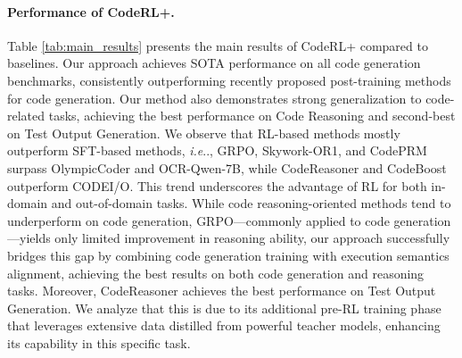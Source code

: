 \documentclass{article}
\makeatletter
\DeclareRobustCommand\onedot{\futurelet\@let@token\@onedot}
\def\@onedot{\ifx\@let@token.\else.\null\fi\xspace}
\def\ie{\emph{i.e}\onedot} \def\Ie{\emph{i.e}\onedot}
\DeclareRobustCommand{\ourapproach}{{\sc CodeRL+}\xspace}
\DeclareRobustCommand{\ourapproachbf}{{\sc \textbf{CodeRL+}}\xspace}
\theoremstyle{definition}
\theoremstyle{remark}
\makeatother
\begin{document}
\paragraph{Performance of \ourapproachbf.}
Table \ref{tab:main_results} presents the main results of \ourapproach compared to baselines. Our approach achieves SOTA performance on all code generation benchmarks, consistently outperforming recently proposed post-training methods for code generation. Our method also demonstrates strong generalization to code-related tasks, achieving the best performance on Code Reasoning and second-best on Test Output Generation. We observe that RL-based methods mostly outperform SFT-based methods, \ie, GRPO, Skywork-OR1, and CodePRM surpass OlympicCoder and OCR-Qwen-7B, while CodeReasoner and CodeBoost outperform CODEI/O. This trend underscores the advantage of RL for both in-domain and out-of-domain tasks. While code reasoning-oriented methods tend to underperform on code generation, GRPO—commonly applied to code generation—yields only limited improvement in reasoning ability, our approach successfully bridges this gap by combining code generation training with execution semantics alignment, achieving the best results on both code generation and reasoning tasks. Moreover, CodeReasoner achieves the best performance on Test Output Generation. We analyze that this is due to its additional pre-RL training phase that leverages extensive data distilled from powerful teacher models, enhancing its capability in this specific task.
\end{document}
